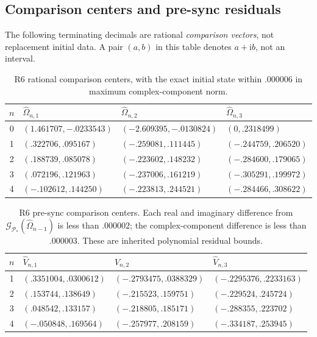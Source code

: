 \documentclass[11pt,a4paper]{article}
\numberwithin{equation}{section}
\newcommand{\ii}{\mathrm i}
\newcommand{\Gmap}{\mathcal G}
\newcommand{\Params}{\mathcal P}
\begin{document}
\subsection{Comparison centers and pre-sync residuals}
The following terminating decimals are rational \emph{comparison vectors},
not replacement initial data. A pair $(a,b)$ in this table denotes
$a+\ii b$, not an interval.
\begin{table}[htbp]
\centering\small
\begin{tabular}{@{}clll@{}}
\toprule
$n$&$\widehat\Omega_{n,1}$&$\widehat\Omega_{n,2}$&$\widehat\Omega_{n,3}$\\ \midrule
0&$(1.461707,-.0233543)$&$(-2.609395,-.0130824)$&$(0,.2318499)$\\
1&$(.322706,.095167)$&$(-.259081,.111445)$&$(-.244759,.206520)$\\
2&$(.188739,.085078)$&$(-.223602,.148232)$&$(-.284600,.179065)$\\
3&$(.072196,.121963)$&$(-.237006,.161219)$&$(-.305291,.199972)$\\
4&$(-.102612,.144250)$&$(-.223813,.244521)$&$(-.284466,.308622)$\\
\bottomrule
\end{tabular}
\caption{R6 rational comparison centers, with the exact initial state
within $.000006$ in maximum complex-component norm.}
\label{tab:centers}
\end{table}
\begin{table}[htbp]
\centering\small
\begin{tabular}{@{}clll@{}}
\toprule
$n$&$\widehat V_{n,1}$&$\widehat V_{n,2}$&$\widehat V_{n,3}$\\ \midrule
1&$(.3351004,.0300612)$&$(-.2793475,.0388329)$&$(-.2295376,.2233163)$\\
2&$(.153744,.138649)$&$(-.215523,.159751)$&$(-.229524,.245724)$\\
3&$(.048542,.133157)$&$(-.218805,.185171)$&$(-.288355,.223702)$\\
4&$(-.050848,.169564)$&$(-.257977,.208159)$&$(-.334187,.253945)$\\
\bottomrule
\end{tabular}
\caption{R6 pre-sync comparison centers. Each real and imaginary difference
from $\Gmap_{\Params_*}(\widehat\Omega_{n-1})$ is less than $.000002$;
the complex-component difference is less than $.000003$. These are
inherited polynomial residual bounds.}
\label{tab:precenters}
\end{table}
\end{document}
